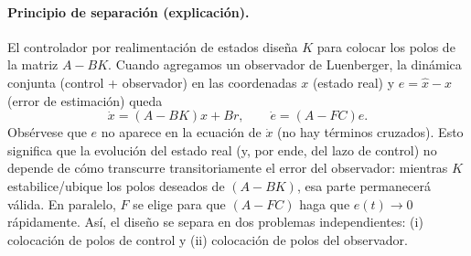 \documentclass[
  11pt,
  letterpaper,
   addpoints,
   answers
  ]{exam}
\begin{document}
\begin{questions}
\begin{solution}
  \paragraph{Principio de separación (explicación).} El controlador por realimentación de estados diseña $K$ para colocar los polos de la matriz $A-BK$. Cuando agregamos un observador de Luenberger, la dinámica conjunta (control + observador) en las coordenadas $x$ (estado real) y $e = \hat x - x$ (error de estimación) queda
  \[
     \dot x = (A-BK)x + Br, \qquad \dot e = (A-FC)e.
  \]
  Obsérvese que $e$ no aparece en la ecuación de $\dot x$ (no hay términos cruzados). Esto significa que la evolución del estado real (y, por ende, del lazo de control) no depende de cómo transcurre transitoriamente el error del observador: mientras $K$ estabilice/ubique los polos deseados de $(A-BK)$, esa parte permanecerá válida. En paralelo, $F$ se elige para que $(A-FC)$ haga que $e(t)\to 0$ rápidamente. Así, el diseño se separa en dos problemas independientes: (i) colocación de polos de control y (ii) colocación de polos del observador.
  

\end{solution}
\end{questions}
\end{document}
